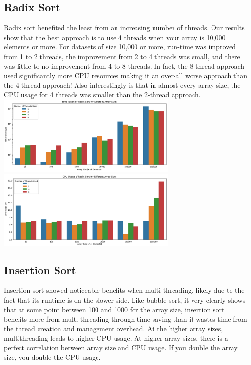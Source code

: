 \documentclass[conference]{IEEEtran}
\begin{document}
\subsection{Radix Sort}
Radix sort benefited the least from an increasing number of threads. Our results show that the best approach is to use 4 threads when your array is 10,000 elements or more. 
For datasets of size 10,000 or more, run-time was improved from 1 to 2 threads, the improvement from 2 to 4 threads was small, and there was little to no improvement from 4 to 8 threads. In fact, the 8-thread approach used significantly more CPU resources making it an over-all worse approach than the 4-thread approach! Also interestingly is that in almost every array size, the CPU usage for 4 threads was smaller than the 2-thread approach.
\includegraphics[width=3.5in]{RadixSortTimeTaken.png}
\includegraphics[width=3.5in]{RadixSortCPUUsage.png}

\subsection{Insertion Sort}
Insertion sort showed noticeable benefits when multi-threading, likely due to the fact that its runtime is on the slower side. Like bubble sort, it very clearly shows that at some point between 100 and 1000 for the array size, insertion sort benefits more from multi-threading through time saving than it wastes time from the thread creation and management overhead. At the higher array sizes, multithreading leads to higher CPU usage. At higher array sizes, there is a perfect correlation between array size and CPU usage. If you double the array size, you double the CPU usage.
\end{document}
